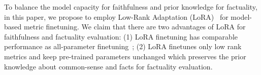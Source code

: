 To balance the model capacity for faithfulness and prior knowledge for factuality, in this paper, we propose to employ Low-Rank Adaptation (LoRA)~\cite{Hu2021LoRALA} for model-based metric finetuning. We claim that there are two advantages of LoRA for faithfulness and factuality evaluation:
(1) LoRA finetuning has comparable performance as all-parameter finetuning~\cite{Hu2021LoRALA};
(2) LoRA finetunes only low rank metrics and keep pre-trained parameters unchanged which preserves the prior knowledge about common-sense and facts for factuality evaluation.



